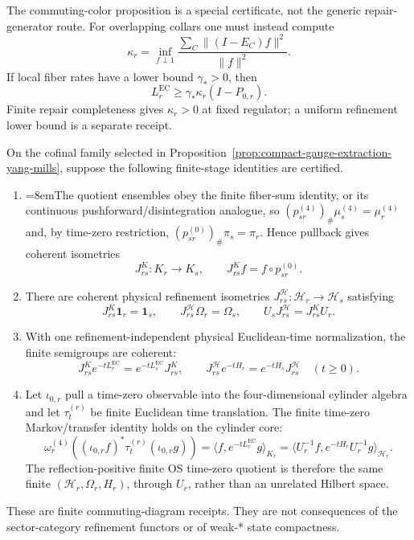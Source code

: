 \begin{remark}
The commuting-color proposition is a special certificate, not the generic repair-generator route.
For overlapping collars one must instead compute
\[
\kappa_r=\inf_{f\perp 1}
\frac{\sum_C\|(I-E_C)f\|^2}{\|f\|^2}.
\]
If local fiber rates have a lower bound \(\gamma_*>0\), then
\[
L_r^{\mathrm{EC}}\ge \gamma_*\kappa_r(I-P_{0,r}).
\]
Finite repair completeness gives \(\kappa_r>0\) at fixed regulator; a uniform refinement lower
bound is a separate receipt.
\end{remark}

\begin{assumption}
\label{ass:compact-gauge-transfer-receipt}
On the cofinal family selected in
Proposition~\ref{prop:compact-gauge-extraction-yang-mills}, suppose the following finite-stage
identities are certified.
\begin{enumerate}[label=\textup{(T\arabic*)},leftmargin=2em]
\item {\emergencystretch=8em\relax The quotient ensembles obey the finite fiber-sum identity, or its continuous
pushforward/disintegration analogue, so
\((p_{sr}^{(4)})_\#\mu_s^{(4)}=\mu_r^{(4)}\) and, by time-zero restriction,
\((p_{sr}^{(0)})_\#\pi_s=\pi_r\). Hence pullback gives coherent isometries
\[
J^K_{rs}:K_r\longrightarrow K_s,
\qquad
J^K_{rs}f=f\circ p_{sr}^{(0)}.
\]\par}
\item There are coherent physical refinement isometries
\(J^{\mathcal H}_{rs}:\mathcal H_r\to\mathcal H_s\) satisfying
\[
J^K_{rs}\mathbf 1_r=\mathbf 1_s,
\qquad
J^{\mathcal H}_{rs}\Omega_r=\Omega_s,
\qquad
U_sJ^{\mathcal H}_{rs}=J^K_{rs}U_r.
\]
\item With one refinement-independent physical Euclidean-time normalization, the finite
semigroups are coherent:
\[
J^K_{rs}e^{-tL_r^{\mathrm{EC}}}
=e^{-tL_s^{\mathrm{EC}}}J^K_{rs},
\qquad
J^{\mathcal H}_{rs}e^{-tH_r}
=e^{-tH_s}J^{\mathcal H}_{rs}
\quad(t\ge0).
\]
\item Let \(\iota_{0,r}\) pull a time-zero observable into the four-dimensional cylinder algebra
and let \(\tau_t^{(r)}\) be finite Euclidean time translation. The finite time-zero
Markov/transfer identity holds on the cylinder core:
\[
\omega_r^{(4)}\!\left(
(\iota_{0,r}f)^*\tau_t^{(r)}(\iota_{0,r}g)
\right)
=\langle f,e^{-tL_r^{\mathrm{EC}}}g\rangle_{K_r}
=\langle U_r^{-1}f,e^{-tH_r}U_r^{-1}g\rangle_{\mathcal H_r}.
\]
The reflection-positive finite OS time-zero quotient is therefore the same finite
\((\mathcal H_r,\Omega_r,H_r)\), through \(U_r\), rather than an unrelated Hilbert space.
\end{enumerate}
These are finite commuting-diagram receipts. They are not consequences of the sector-category
refinement functors or of weak-* state compactness.
\end{assumption}

